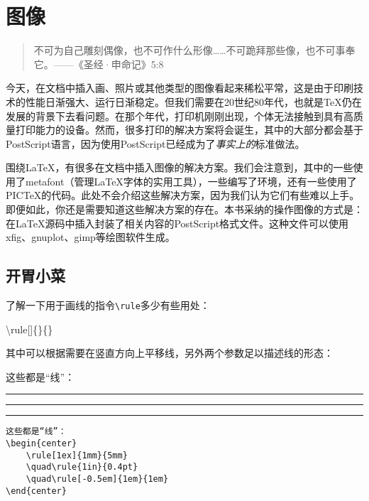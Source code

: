\chapter{图像}

\begin{quote}
    不可为自己雕刻偶像，也不可作什么形像……不可跪拜那些像，也不可事奉它。——《圣经·申命记》5:8
\end{quote}

今天，在文档中插入画、照片或其他类型的图像看起来稀松平常，这是由于印刷技术的性能日渐强大、运行日渐稳定。但我们需要在20世纪80年代，也就是\TeX 仍在发展的背景下去看问题。在那个年代，打印机刚刚出现，个体无法接触到具有高质量打印能力的设备。然而，很多打印的解决方案将会诞生，其中的大部分都会基于PostScript语言，因为使用PostScript已经成为了\emph{事实上的}标准做法。

围绕\LaTeX ，有很多在文档中插入图像的解决方案。我们会注意到，其中的一些使用了\textsf{metafont}（管理\LaTeX 字体的实用工具），一些编写了环境，还有一些使用了PIC\TeX 的代码。此处不会介绍这些解决方案，因为我们认为它们有些难以上手。即便如此，你还是需要知道这些解决方案的存在。本书采纳的操作图像的方式是：在\LaTeX 源码中插入封装了相关内容的PostScript格式文件。这种文件可以使用\textsf{xfig}、\textsf{gnuplot}、\textsf{gimp}等绘图软件生成。

\section{开胃小菜}

了解一下用于画线的指令\verb|\rule|多少有些用处：

\begin{dmd}
\backslash rule[]\{\}\{\}
\end{dmd}

其中可以根据需要在竖直方向上平移线，另外两个参数足以描述线的形态：

\begin{codelist}[5.1]{
    这些都是“线”：
\begin{center}
    \rule[1ex]{1mm}{5mm}
    \quad\rule{1in}{0.4pt}
    \quad\rule[-0.5em]{1em}{1em}
\end{center}
}\begin{verbatim}
这些都是“线”：
\begin{center}
    \rule[1ex]{1mm}{5mm}
    \quad\rule{1in}{0.4pt}
    \quad\rule[-0.5em]{1em}{1em}
\end{center}
\end{verbatim}
\end{codelist}

